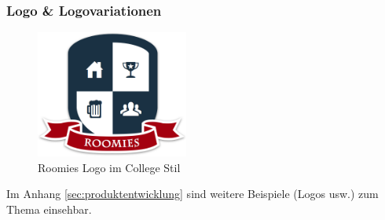 \subsubsection*{Logo \& Logovariationen}
\begin{figure}[H]
	\centering
	\includegraphics[width=5cm]{content/images/roomies-withshadow.png}
	\caption{Roomies Logo im College Stil}
\end{figure}

Im Anhang \ref{sec:produktentwicklung} sind weitere Beispiele (Logos usw.) zum Thema \emph{} einsehbar.